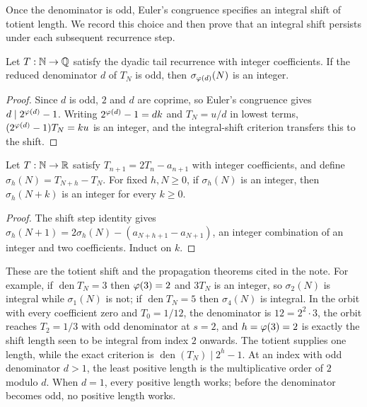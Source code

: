 \documentclass[11pt]{article}
\makeatletter
\newcommand{\compatlabel}[1]{\ltx@label{#1}}
\makeatother
\begin{document}
Once the denominator is odd, Euler's congruence specifies an integral
shift of totient length.  We record this choice and then prove that
an integral shift persists under each subsequent recurrence step.

\begin{proposition}\label{long251:xr:totient}\compatlabel{res:totient}
Let $T:\mathbb{N}\to\mathbb{Q}$ satisfy the dyadic tail recurrence with integer coefficients.  If the
reduced denominator $d$ of $T_N$ is odd, then $\sigma_{\varphi(d)}(N)$ is an
integer.
\end{proposition}

\begin{proof}
Since $d$ is odd, $2$ and $d$ are coprime, so Euler's congruence gives
$d\mid2^{\varphi(d)}-1$.  Writing $2^{\varphi(d)}-1=dk$ and $T_N=u/d$ in lowest terms,
$(2^{\varphi(d)}-1)T_N=ku$ is an integer, and the integral-shift criterion
transfers this to the shift.
\end{proof}

\begin{proposition}[propagation]\label{long251:xr:propagate}\compatlabel{res:propagate}
Let $T:\mathbb{N}\to\mathbb{R}$ satisfy $T_{n+1}=2T_n-a_{n+1}$ with integer coefficients,
and define $\sigma_h(N)=T_{N+h}-T_N$.  For fixed $h,N\ge0$,
if $\sigma_h(N)$ is an integer, then $\sigma_h(N+k)$ is an integer
for every $k\ge0$.
\end{proposition}

\begin{proof}
The shift step identity gives
$\sigma_h(N+1)=2\sigma_h(N)-(a_{N+h+1}-a_{N+1})$, an integer combination of an
integer and two coefficients.  Induct on $k$.
\end{proof}

\noindent These are the totient shift and the propagation theorems cited in the
note.  For example, if $\operatorname{den}T_N=3$ then $\varphi(3)=2$ and
$3T_N$ is an integer, so $\sigma_2(N)$ is integral while $\sigma_1(N)$ is not;
if $\operatorname{den}T_N=5$ then $\sigma_4(N)$ is integral.  In the orbit with
every coefficient zero and $T_0=1/12$, the denominator is $12=2^2\cdot3$, the orbit
reaches $T_2=1/3$ with odd denominator at $s=2$, and $h=\varphi(3)=2$ is exactly the
shift length seen to be integral from index $2$ onwards.  The totient supplies one length, while the exact criterion is
$\operatorname{den}(T_N)\mid2^{h}-1$.  At an index with odd denominator
$d>1$, the least positive length is the multiplicative order of $2$
modulo $d$.  When $d=1$, every positive length works; before the
denominator becomes odd, no positive length works.
\end{document}
